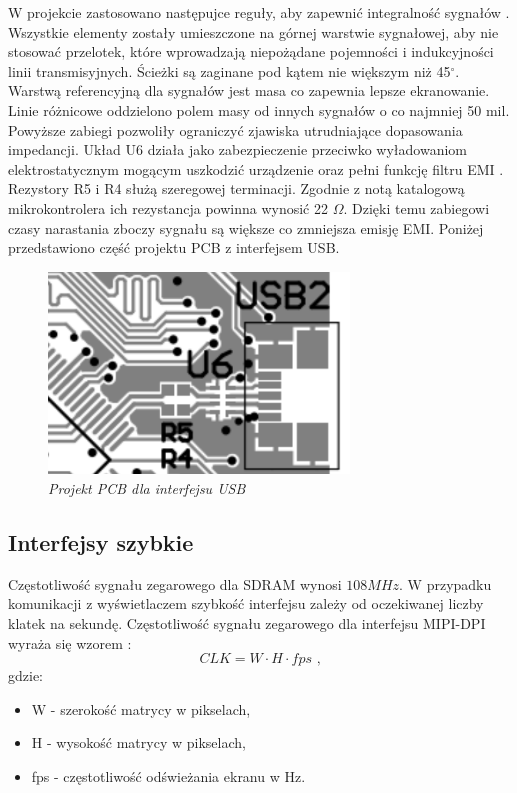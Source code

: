 \documentclass[eng,printmode]{mgr}
\begin{document}
W projekcie zastosowano następujce reguły, aby zapewnić integralność sygnałów \cite{usbLayout}. Wszystkie elementy zostały umieszczone na górnej warstwie sygnałowej, aby nie stosować przelotek, które wprowadzają niepożądane pojemności i indukcyjności linii transmisyjnych. Ścieżki są zaginane pod kątem nie większym niż 45$^\circ$. Warstwą referencyjną dla sygnałów jest masa co zapewnia lepsze ekranowanie. Linie różnicowe oddzielono polem masy od innych sygnałów o co najmniej 50 mil. Powyższe zabiegi pozwoliły ograniczyć zjawiska utrudniające dopasowania impedancji. Układ U6 działa jako zabezpieczenie przeciwko wyładowaniom elektrostatycznym mogącym uszkodzić urządzenie oraz pełni funkcję filtru EMI . Rezystory R5 i R4 służą szeregowej terminacji. Zgodnie z notą katalogową mikrokontrolera ich rezystancja powinna wynosić 22 \textbf{$\Omega$}\cite{stmsheet}. Dzięki temu zabiegowi czasy narastania zboczy sygnału są większe co zmniejsza emisję EMI. Poniżej przedstawiono część projektu PCB z interfejsem USB.

\begin{figure}[!h]
    \centering
    \includegraphics[width=8cm]{pcb/usb.png}
    \caption{\textit{Projekt PCB dla interfejsu USB}}
\end{figure}

\subsection*{Interfejsy szybkie}
Częstotliwość sygnału zegarowego dla SDRAM wynosi $108MHz$. W przypadku komunikacji z wyświetlaczem szybkość interfejsu zależy od oczekiwanej liczby klatek na sekundę. Częstotliwość sygnału zegarowego dla interfejsu MIPI-DPI wyraża się wzorem \cite{LTDC}:
\begin{equation}
CLK = W \cdot H \cdot fps \textrm{ ,} \label{eq:fps}
\end{equation}
gdzie:
\begin{itemize}
  \item W - szerokość matrycy w pikselach,
  \item H - wysokość matrycy w pikselach,
  \item fps - częstotliwość odświeżania ekranu w Hz.
\end{itemize}
\end{document}
